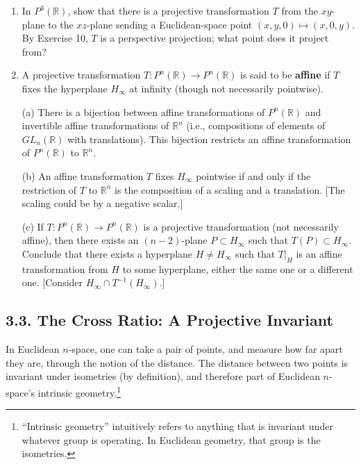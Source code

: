 \documentclass[leqno]{book}
\begin{document}
\begin{enumerate}
\item In $P^3(\mathbb R)$, show that there is a projective transformation $T$ from the $xy$-plane to the $xz$-plane sending a Euclidean-space point $(x,y,0)\mapsto(x,0,y)$.  By Exercise 10, $T$ is a perspective projection; what point does it project from?

\item A projective transformation $T:P^n(\mathbb R)\to P^n(\mathbb R)$ is said to be \textbf{affine} if $T$ fixes the hyperplane $H_\infty$ at infinity (though not necessarily pointwise).

(a) There is a bijection between affine transformations of $P^n(\mathbb R)$ and invertible affine transformations of $\mathbb R^n$ (i.e., compositions of elements of $GL_n(\mathbb R)$ with translations).  This bijection restricts an affine transformation of $P^n(\mathbb R)$ to $\mathbb R^n$.

(b) An affine transformation $T$ fixes $H_\infty$ pointwise if and only if the restriction of $T$ to $\mathbb R^n$ is the composition of a scaling and a translation.  [The scaling could be by a negative scalar.]

(c) If $T:P^n(\mathbb R)\to P^n(\mathbb R)$ is a projective transformation (not necessarily affine), then there exists an $(n-2)$-plane $P\subset H_\infty$ such that $T(P)\subset H_\infty$.  Conclude that there exists a hyperplane $H\ne H_\infty$ such that $T|_H$ is an affine transformation from $H$ to some hyperplane, either the same one or a different one.  [Consider $H_\infty\cap T^{-1}(H_\infty)$.]
\end{enumerate}

\subsection*{3.3. The Cross Ratio: A Projective Invariant}
In Euclidean $n$-space, one can take a pair of points, and measure how far apart they are, through the notion of the distance.  The distance between two points is invariant under isometries (by definition), and therefore part of Euclidean $n$-space's intrinsic geometry.\footnote{``Intrinsic geometry'' intuitively refers to anything that is invariant under whatever group is operating.  In Euclidean geometry, that group is the isometries.}
\end{document}

